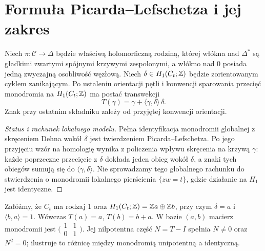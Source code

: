 \section{Formuła Picarda--Lefschetza i jej zakres}
\begin{twierdzenie}
\label{thm:picard-lefschetz-xiv}
Niech $\pi:\mathcal C\to\Delta$ będzie właściwą
holomorficzną rodziną, której włókna nad
$\Delta^*$ są gładkimi zwartymi spójnymi
krzywymi zespolonymi, a włókno nad $0$ posiada
jedną zwyczajną osobliwość węzłową.
Niech $\delta\in H_1(C_t;\mathbb{Z})$ będzie
zorientowanym cyklem zanikającym.
Po ustaleniu orientacji pętli i konwencji
sparowania przecięć monodromia na $H_1(C_t;\mathbb{Z})$
ma postać transwekcji
\[
T(\gamma)=\gamma+\langle\gamma,\delta\rangle\,\delta.
\]
Znak przy ostatnim składniku zależy od
przyjętej konwencji orientacji.
\end{twierdzenie}
\begin{proof}[Status i rachunek lokalnego modelu]
Pełna identyfikacja monodromii globalnej z
skręceniem Dehna wokół $\delta$ jest twierdzeniem
Picarda--Lefschetza. Po jego przyjęciu wzór na
homologię wynika z policzenia wpływu skręcenia
na krzywą $\gamma$: każde poprzeczne przecięcie
z $\delta$ dokłada jeden obieg wokół $\delta$,
a znaki tych obiegów sumują się do
$\langle\gamma,\delta\rangle$.
Nie sprowadzamy tego globalnego rachunku do
stwierdzenia o monodromii lokalnego pierścienia
$\{zw=t\}$, gdzie działanie na $H_1$ jest identyczne.
\end{proof}
\begin{przyklad}
Załóżmy, że $C_t$ ma rodzaj $1$ oraz
$H_1(C_t;\mathbb{Z})=\mathbb{Z} a\oplus\mathbb{Z} b$, przy czym
$\delta=a$ i $\langle b,a\rangle=1$.
Wówczas $T(a)=a$, $T(b)=b+a$.
W bazie $(a,b)$ macierz monodromii jest
$\bigl(\begin{smallmatrix}1&1\\0&1\end{smallmatrix}\bigr)$.
Jej nilpotentna część $N=T-I$ spełnia
$N\ne0$ oraz $N^2=0$; ilustruje to różnicę
między monodromią unipotentną a identyczną.
\end{przyklad}

